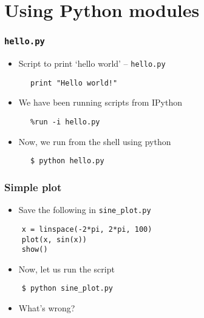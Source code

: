 \section{Using Python modules}

\begin{frame}[fragile]
  \frametitle{\texttt{hello.py}}
    \begin{itemize}
    \item Script to print `hello world' -- \texttt{hello.py}
    \end{itemize}
    \begin{lstlisting}
      print "Hello world!"
    \end{lstlisting}
    \begin{itemize}
    \item We have been running scripts from IPython
    \end{itemize}
    \begin{lstlisting}
      %run -i hello.py
    \end{lstlisting}
    \begin{itemize}
    \item Now, we run from the shell using python
    \end{itemize}
    \begin{lstlisting}
      $ python hello.py
    \end{lstlisting} %
\end{frame}

\begin{frame}[fragile]
  \frametitle{Simple plot}
  \begin{itemize}
  \item Save the following in \texttt{sine\_plot.py} 
  \end{itemize}
  \begin{lstlisting}
    x = linspace(-2*pi, 2*pi, 100)
    plot(x, sin(x))
    show()
  \end{lstlisting}
  \begin{itemize}
  \item Now, let us run the script
  \end{itemize}
  \begin{lstlisting}
    $ python sine_plot.py
  \end{lstlisting} %
  \begin{itemize}
  \item What's wrong?
  \end{itemize}
\end{frame}


